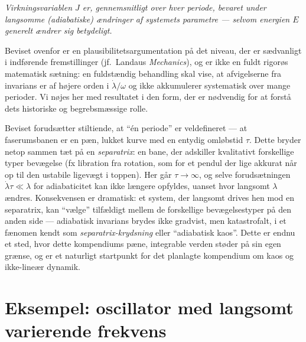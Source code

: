 \begin{center}
\emph{Virkningsvariablen $J$ er, gennemsnitligt over hver periode,
bevaret under langsomme (adiabatiske) ændringer af systemets
parametre — selvom energien $E$ generelt ændrer sig betydeligt.}
\end{center}

\begin{bemaerkning}
Beviset ovenfor er en plausibilitetsargumentation på det niveau, der
er sædvanligt i indførende fremstillinger (jf.\ Landaus \emph{Mechanics}),
og er ikke en fuldt rigorøs matematisk sætning: en fuldstændig
behandling skal vise, at afvigelserne fra invarians er af højere orden
i $\dot\lambda/\omega$ og ikke akkumulerer systematisk over mange
perioder. Vi nøjes her med resultatet i den form, der er nødvendig for
at forstå dets historiske og begrebsmæssige rolle.
\end{bemaerkning}

\begin{bemaerkning}
Beviset forudsætter stiltiende, at ``én periode'' er veldefineret —
at faserumsbanen er en pæn, lukket kurve med en entydig omløbstid
$\tau$. Dette bryder netop sammen tæt på en \emph{separatrix}: en
bane, der adskiller kvalitativt forskellige typer bevægelse (fx
libration fra rotation, som for et pendul der lige akkurat når op til
den ustabile ligevægt i toppen). Her går $\tau\to\infty$, og selve
forudsætningen $\dot\lambda\tau\ll\lambda$ for adiabaticitet kan ikke
længere opfyldes, uanset hvor langsomt $\lambda$ ændres. Konsekvensen
er dramatisk: et system, der langsomt drives hen mod en separatrix,
kan ``vælge'' tilfældigt mellem de forskellige bevægelsestyper på den
anden side — adiabatisk invarians brydes ikke gradvist, men
katastrofalt, i et fænomen kendt som \emph{separatrix-krydsning} eller
``adiabatisk kaos''. Dette er endnu et sted, hvor dette kompendiums
pæne, integrable verden støder på sin egen grænse, og er et
naturligt startpunkt for det planlagte kompendium om kaos og
ikke-lineær dynamik.
\end{bemaerkning}

\section{Eksempel: oscillator med langsomt varierende frekvens}

